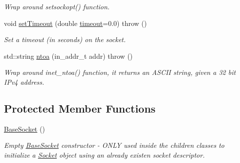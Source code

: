 \begin{CompactItemize}
\begin{CompactList}\small\item\em Wrap around setsockopt() function. \item\end{CompactList}\item 
void \hyperlink{classusock_1_1BaseSocket_e31552b42df68bc68fe557caf6e75128}{setTimeout} (double \hyperlink{classusock_1_1BaseSocket_b419e8fd0b849c74b73a02d6bd9081e3}{timeout}=0.0)  throw ()
\begin{CompactList}\small\item\em Set a timeout (in seconds) on the socket. \item\end{CompactList}\item 
std::string \hyperlink{classusock_1_1BaseSocket_3da108b8c23df3b521ded0bc4ae5295c}{ntoa} (in\_\-addr\_\-t addr)  throw ()
\begin{CompactList}\small\item\em Wrap around inet\_\-ntoa() function, it returns an ASCII string, given a 32 bit IPv4 address. \item\end{CompactList}\end{CompactItemize}
\subsection*{Protected Member Functions}
\begin{CompactItemize}
\item 
\hyperlink{classusock_1_1BaseSocket_20f598433d6c3a97656f0179f7371218}{BaseSocket} ()
\begin{CompactList}\small\item\em Empty \hyperlink{classusock_1_1BaseSocket}{BaseSocket} constructor - ONLY used inside the children classes to initialize a \hyperlink{classusock_1_1Socket}{Socket} object using an already existen socket descriptor. \item\end{CompactList}\end{CompactItemize}
